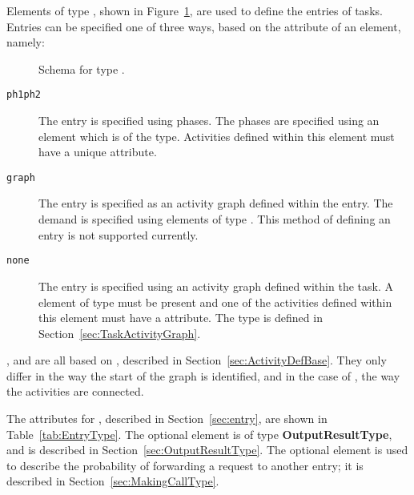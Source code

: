 Elements of type , shown in Figure~\ref{fig:EntryType}, are used to define the entries
of tasks.  Entries can be specified one of three ways, based on the attribute  of an
 element, namely:
\begin{figure}[htbp]
  \centering
  \caption{Schema for type .}
  \label{fig:EntryType}
\end{figure}
\begin{description}
\item[\texttt{ph1ph2}] The entry is specified using phases.  The
  phases are specified using an 
  element which is of the  type.
  Activities defined within this element must have a unique
   attribute.  
\item[\texttt{graph}] The entry is specified as an activity
  graph defined within the entry.  The demand is
  specified using elements of type .
  This method of defining an entry is not supported currently.
\item[\texttt{none}] The entry is specified using an activity graph
  defined within the task.  A  element
  of type  must be present and one of the
  activities defined within this element must have a
   attribute.  The
   type is defined in
  Section~\ref{sec:TaskActivityGraph}.
\end{description}
,    and
 are all based on
, described in
Section~\ref{sec:ActivityDefBase}.  They only differ in the way the
start of the graph is identified, and in the case of
, the way the activities are connected.  

The attributes for , described in
Section~\ref{sec:entry}, are shown in Table~\ref{tab:EntryType}.  The optional
element  is of type
\textbf{OutputResultType}, and is described in
Section~\ref{sec:OutputResultType}.  The optional element
 is used to describe the probability of
forwarding a request to another entry; it is described in
Section~\ref{sec:MakingCallType}.

